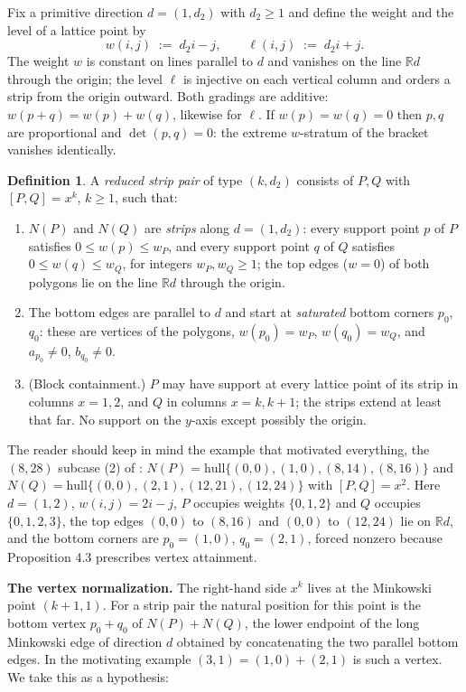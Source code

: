 \documentclass[11pt]{article}
\theoremstyle{definition}
\newtheorem{definition}[theorem]{Definition}
\theoremstyle{remark}
\begin{document}
Fix a primitive direction $d=(1,d_2)$ with $d_2\geq 1$ and define the weight and the level of a lattice point by
\[
w(i,j) \;:=\; d_2 i - j, \qquad \ell(i,j) \;:=\; d_2 i + j .
\]
The weight $w$ is constant on lines parallel to $d$ and vanishes on the line $\mathbb{R}d$ through the origin; the level $\ell$ is injective on each vertical column and orders a strip from the origin outward. Both gradings are additive: $w(p+q)=w(p)+w(q)$, likewise for $\ell$. If $w(p)=w(q)=0$ then $p,q$ are proportional and $\det(p,q)=0$: the extreme $w$-stratum of the bracket vanishes identically.

\begin{definition}\label{def:strip}
A \emph{reduced strip pair} of type $(k,d_2)$ consists of $P,Q$ with $[P,Q]=x^k$, $k\geq 1$, such that:
\begin{enumerate}
\item[(S1)] $N(P)$ and $N(Q)$ are \emph{strips} along $d=(1,d_2)$: every support point $p$ of $P$ satisfies $0\leq w(p)\leq w_P$, and every support point $q$ of $Q$ satisfies $0\leq w(q)\leq w_Q$, for integers $w_P,w_Q\geq 1$; the top edges ($w=0$) of both polygons lie on the line $\mathbb{R}d$ through the origin.
\item[(S2)] The bottom edges are parallel to $d$ and start at \emph{saturated} bottom corners $p_0$, $q_0$: these are vertices of the polygons, $w(p_0)=w_P$, $w(q_0)=w_Q$, and $a_{p_0}\neq 0$, $b_{q_0}\neq 0$.
\item[(S3)] (Block containment.) $P$ may have support at every lattice point of its strip in columns $x=1,2$, and $Q$ in columns $x=k,k+1$; the strips extend at least that far. No support on the $y$-axis except possibly the origin.
\end{enumerate}
\end{definition}

The reader should keep in mind the example that motivated everything, the $(8,28)$ subcase (2) of \cite{GGHV}: $N(P)=\mathrm{hull}\{(0,0),(1,0),(8,14),(8,16)\}$ and $N(Q)=\mathrm{hull}\{(0,0),(2,1),(12,21),(12,24)\}$ with $[P,Q]=x^2$. Here $d=(1,2)$, $w(i,j)=2i-j$, $P$ occupies weights $\{0,1,2\}$ and $Q$ occupies $\{0,1,2,3\}$, the top edges $(0,0)$ to $(8,16)$ and $(0,0)$ to $(12,24)$ lie on $\mathbb{R}d$, and the bottom corners are $p_0=(1,0)$, $q_0=(2,1)$, forced nonzero because Proposition 4.3 prescribes vertex attainment.

\medskip
\noindent\textbf{The vertex normalization.}
The right-hand side $x^k$ lives at the Minkowski point $(k+1,1)$. For a strip pair the natural position for this point is the bottom vertex $p_0+q_0$ of $N(P)+N(Q)$, the lower endpoint of the long Minkowski edge of direction $d$ obtained by concatenating the two parallel bottom edges. In the motivating example $(3,1)=(1,0)+(2,1)$ is such a vertex. We take this as a hypothesis:
\end{document}
